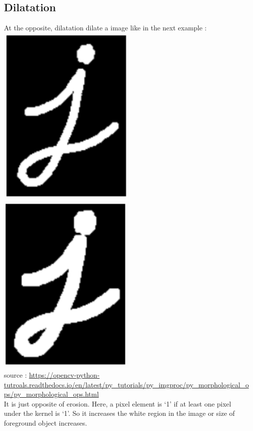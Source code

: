 \documentclass{article}
\begin{document}
\subsection{Dilatation}

At the opposite, dilatation dilate a image like in the next example :\\

\includegraphics[width=6.8cm]{images/img12.png} 
\includegraphics[width=6.8cm]{images/img14.png}\\ 
source : \url{https://opencv-python-tutroals.readthedocs.io/en/latest/py_tutorials/py_imgproc/py_morphological_ops/py_morphological_ops.html}\\

It is just opposite of erosion. Here, a pixel element is ‘1’ if at least one pixel under the kernel is ‘1’. So it increases the white region in the image or size of foreground object increases.
\end{document}
